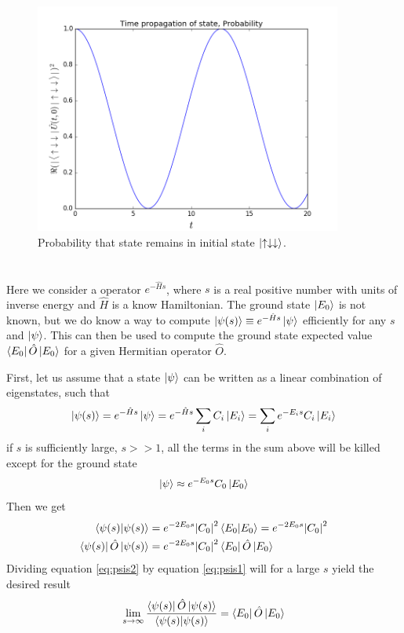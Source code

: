 \documentclass{article}
\begin{document}
\begin{figure}
	\centering
	\includegraphics[width=0.9\textwidth]{figures/probability.png}
	\caption{Probability that state remains in initial state $\ket{\uparrow\downarrow\downarrow}$.}
	\label{fig:probability}
\end{figure}

\section{}
Here we consider a operator $e^{-\hat{H}s}$, where $s$ is a real positive number with units of inverse energy and $\hat{H}$ is a know Hamiltonian. The ground state $\ket{E_0}$ is not known, but we do know a way to compute $\ket{\psi(s)}\equiv e^{-\hat{H}s}\ket{\psi}$ efficiently for any $s$ and $\ket{\psi}$. This can then be used to compute the ground state expected value  $\bra{E_0}\hat{O}\ket{E_0}$ for a given Hermitian operator $\hat{O}$.

First, let us assume that a state $\ket{\psi}$ can be written as a linear combination of eigenstates, such that
\begin{equation*}
\ket{\psi(s)}=e^{-\hat{H}s}\ket{\psi}=e^{-\hat{H}s}\sum_i C_i\ket{E_i}=\sum_i e^{-E_i s}C_i\ket{E_i}
\end{equation*}
if $s$ is sufficiently large, $s>>1$, all the terms in the sum above will be killed except for the ground state 
\begin{equation*}
\ket{\psi} \approx e^{-E_0s}C_0\ket{E_0}
\end{equation*}
Then we get
\begin{align}
\braket{\psi(s)} &= e^{-2E_0s}\abs{C_0}^2\braket{E_0}=e^{-2E_0s}\abs{C_0}^2 \label{eq:psis1} \\
\bra{\psi(s)}\hat{O}\ket{\psi(s)} &= e^{-2E_0s}\abs{C_0}^2\bra{E_0}\hat{O}\ket{E_0} \label{eq:psis2}
\end{align}
Dividing equation \ref{eq:psis2} by equation \ref{eq:psis1} will for a large $s$ yield the desired result
\begin{equation}
\lim_{s\to\infty}\frac{\bra{\psi(s)}\hat{O}\ket{\psi(s)}}{\braket{\psi(s)}}=\bra{E_0}\hat{O}\ket{E_0}
\end{equation}
\end{document}
